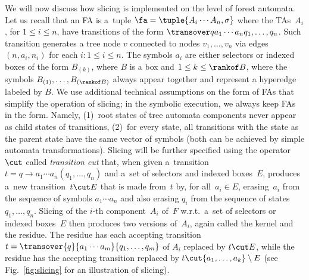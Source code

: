 {We will now discuss how slicing is implemented on the level of forest automata.
Let us recall that an FA is a~tuple $\fa = \tuple{A_i \cdots A_n,\sigma}$ where the TAs~$A_i$, for $1\leq i \leq n$,
have transitions of the form $\transover q {a_1\cdots a_n} {q_1,\ldots, q_n}$. 
Such transition generates a tree node $v$ connected to nodes $v_1,\ldots,v_n$ via edges $(n,a_i,n_i)$ for each $i:1\leq i \leq n$.   
The symbols $a_i$ are either selectors or indexed boxes of the form $B_{(k)}$, where $B$ is a box and $1\leq k \leq \rankof B$, where the symbols $B_{(1)},\ldots,B_{(\rankof B)}$ always appear together and represent a hyperedge labeled by $B$.
%
We use additional technical assumptions on the form of FAs that simplify the
operation of slicing; in the symbolic execution, we always keep FAs in the form.
%
Namely, (1)~root states of tree automata components never appear as child
states of transitions,
(2)~for every state, all transitions with the state as the parent state have
the same vector of symbols
(both can be achieved by simple automata transformations).
%
Slicing will be further specified using the operator $\cut$ called
\emph{transition cut} that, when given a~transition $t =  q \rightarrow
a_1\cdots a_n (q_1,\dots,q_n)$ and a~set of selectors and indexed boxes~$E$,
produces a~new transition~$t \cut E$ that is made from~$t$ by, for all~$a_i \in
E$, erasing~$a_i$ from the sequence of symbols $a_1 \cdots a_n$ and also
erasing $q_i$ from the sequence of states $q_1,\ldots,q_n$.
%
Slicing of the $i$-th component~$A_i$ of~$F$ w.r.t.\ a~set of selectors or
indexed boxes~$E$ then produces two versions of~$A_i$, again called the kernel
and the residue.
The residue has each accepting transition $t = \transover {q}
{a_1\cdots a_m} {q_1,\ldots,q_m}$ of $A_i$ replaced by $t\cut E$, while the
residue has the accepting transition replaced by $t\cut
\{a_1,\ldots,a_k\}\setminus E$ (see Fig.~\ref{fig:slicing} for an illustration
of slicing).
 


}
